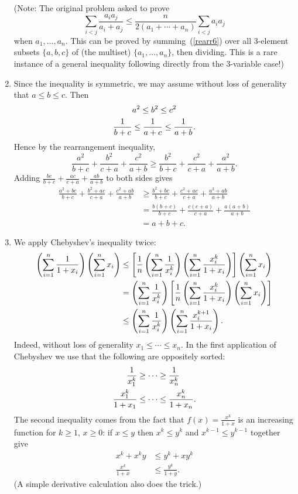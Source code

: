 \begin{enumerate}
(Note: The original problem asked to prove
\[
\sum_{i<j} \frac{a_ia_j}{a_i+a_j}\le \frac{n}{2(a_1+\cdots +a_n)}\sum_{i<j} a_ia_j
\]
when $a_1,\ldots, a_n$. This can be proved by summing~(\ref{rearr6}) over all 3-element subsets $\{a,b,c\}$ of (the multiset) $\{a_1,\ldots, a_n\}$, then dividing. This is a rare instance of a general inequality following directly from the 3-variable case!)
\item
Since the inequality is symmetric, we may assume without loss of generality that $a\le b\le c$. Then
\begin{gather*}
a^2\le b^2\le c^2\\
\frac{1}{b+c}\le \frac{1}{a+c}\le \frac{1}{a+b}.
\end{gather*}
Hence by the rearrangement inequality,
\[
\frac{a^2}{b+c}+\frac{b^2}{c+a}+\frac{c^2}{a+b}\ge \frac{b^2}{b+c}+\frac{c^2}{c+a}+\frac{a^2}{a+b}.
\]
Adding $\frac{bc}{b+c}+\frac{ac}{c+a}+\frac{ab}{a+b}$ to both sides gives
\begin{align*}
\frac{a^2+bc}{b+c}+\frac{b^2+ac}{c+a}+\frac{c^2+ab}{a+b}
&\geq \frac{b^2+bc}{b+c}+\frac{c^2+ac}{c+a}+\frac{a^2+ab}{a+b}\\
&=\frac{b(b+c)}{b+c}+\frac{c(c+a)}{c+a}+\frac{a(a+b)}{a+b}\\
&=a+b+c.
\end{align*}
\item
We apply Chebyshev's inequality twice:
\begin{align*}
\left( {\sum_{i=1}^n \frac{1}{1+x_i}} \right)\left( {\sum_{i=1}^n x_i} \right) 
&\le \left[ {\frac{1}{n}\left( {\sum_{i=1}^n\frac{1}{x_i^k}} \right)\left( {\sum_{i=1}^n \frac{x_i^k}{1+x_i}} \right)} \right]\left( {\sum_{i=1}^n x_i} \right) \\
&= \left( {\sum_{i=1}^n\frac{1}{x_i^k}} \right)\left[ {\frac{1}{n}\left( {\sum_{i=1}^n \frac{x_i^k}{1+x_i}} \right)\left( {\sum_{i=1}^n x_i} \right)} \right] \\
&\le \left(\sum_{i=1}^n \frac1{x_i^k}\right)\left(\sum_{i=1}^n \frac{x_i^{k+1}}{1+x_i}\right).
\end{align*}
Indeed, without loss of generality $x_1\le \cdots \le x_n$. 
In the first application of Chebyshev we use that the following are oppositely sorted:
\begin{align*}
\frac{1}{x_1^k}&\ge\cdots \ge \frac{1}{x_n^k}\\
\frac{x_1^k}{1+x_1}&\le\cdots \le \frac{x_n^k}{1+x_n}.
\end{align*}
The second inequality comes from the fact that $f(x)=\frac{x^k}{1+x}$ is an increasing function for $k\ge 1$, $x\ge 0$: if $x\le y$ then $x^k\le y^k$ and $x^{k-1}\le y^{k-1}$ together give
\begin{align*}
x^k+x^ky&\le y^k+xy^k\\
\frac{x^k}{1+x}&\le \frac{y^k}{1+y}.
\end{align*}
(A simple derivative calculation also does the trick.)


\end{enumerate}
